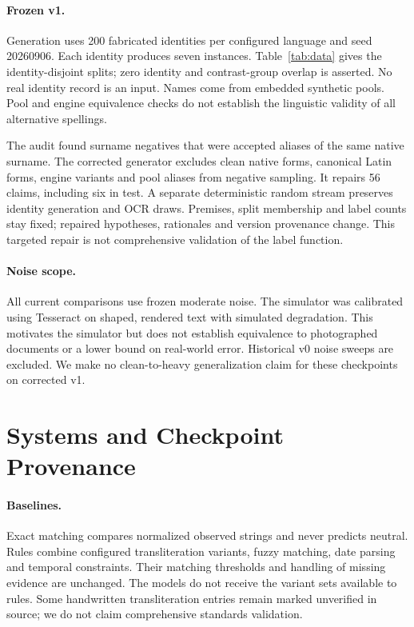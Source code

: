 \documentclass[11pt]{article}
\begin{document}
\paragraph{Frozen v1.}
Generation uses 200 fabricated identities per configured language and seed
20260906. Each identity produces seven instances. Table~\ref{tab:data} gives
the identity-disjoint splits; zero identity and contrast-group overlap is
asserted. No real identity record is an input. Names come from embedded
synthetic pools. Pool and engine equivalence checks do not establish the
linguistic validity of all alternative spellings.
\begin{table}[t]
\centering\small
\caption{Frozen v1 splits. E, C and N are generator labels.}\label{tab:data}
\end{table}

The audit found surname negatives that were accepted aliases of the same
native surname. The corrected generator excludes clean native forms, canonical
Latin forms, engine variants and pool aliases from negative sampling. It repairs
56 claims, including six in test. A separate deterministic random stream
preserves identity generation and OCR draws. Premises, split membership and
label counts stay fixed; repaired hypotheses, rationales and version provenance
change. This targeted repair is not comprehensive validation of the label function.

\paragraph{Noise scope.}
All current comparisons use frozen moderate noise. The simulator was calibrated
using Tesseract \citep{smith2007tesseract} on shaped, rendered text with simulated
degradation. This motivates the simulator but does not establish equivalence
to photographed documents or a lower bound on real-world error. Historical v0
noise sweeps are excluded. We make no clean-to-heavy generalization claim for
these checkpoints on corrected v1.

\section{Systems and Checkpoint Provenance}
\paragraph{Baselines.}
Exact matching compares normalized observed strings and never predicts neutral.
Rules combine configured transliteration variants, fuzzy matching, date parsing
and temporal constraints. Their matching thresholds and handling of missing
evidence are unchanged. The models do not receive the variant sets available
to rules. Some handwritten transliteration entries remain marked unverified
in source; we do not claim comprehensive standards validation.
\end{document}

